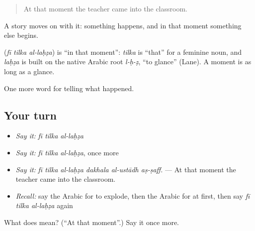 \begin{quote}
At that moment the teacher came into the classroom.
\end{quote}

A story moves on with it: something happens, and in that moment something else begins.

\begin{cousinweb}
\textbf{  } (\emph{fī tilka al-laḥẓa}) is \textquotedblleft{}in that moment\textquotedblright{}: \emph{tilka} is \textquotedblleft{}that\textquotedblright{} for a feminine noun, and \emph{laḥẓa} is built on the native Arabic root \emph{l-ḥ-ẓ}, \textquotedblleft{}to glance\textquotedblright{} (Lane). A moment is as long as a glance.
\end{cousinweb}

\begin{grammarlens}[title={What you've built}]
One more word for telling what happened.
\end{grammarlens}

\subsection*{Your turn}
\begin{itemize}
\raggedright
  \item \emph{Say it:} \emph{fī tilka al-laḥẓa}
  \item \emph{Say it:} \emph{fī tilka al-laḥẓa}, once more
  \item \emph{Say it:} \emph{fī tilka al-laḥẓa dakhala al-ustādh aṣ-ṣaff.} — At that moment the teacher came into the classroom.
  \item \emph{Recall:} say the Arabic for to explode, then the Arabic for at first, then say \emph{fī tilka al-laḥẓa} again
\end{itemize}

\begin{tcolorbox}[breakable,colback=teal!4,colframe=teal!35!black,title={Before you move on}]
What does    mean? (\textquotedblleft{}At that moment\textquotedblright{}.) Say it once more.
\end{tcolorbox}
